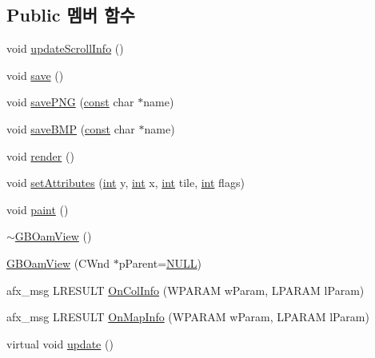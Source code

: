 \subsection*{Public 멤버 함수}
\begin{DoxyCompactItemize}
\item 
void \mbox{\hyperlink{class_g_b_oam_view_a20ce1c6ed837362872920c23e281e523}{update\+Scroll\+Info}} ()
\item 
void \mbox{\hyperlink{class_g_b_oam_view_a04f7a345e1f9d71b149b9df3b2db30d4}{save}} ()
\item 
void \mbox{\hyperlink{class_g_b_oam_view_a06b80040df2b94b034d5b0822ebc27ed}{save\+P\+NG}} (\mbox{\hyperlink{getopt1_8c_a2c212835823e3c54a8ab6d95c652660e}{const}} char $\ast$name)
\item 
void \mbox{\hyperlink{class_g_b_oam_view_a03a02a1b15d607e9891e58695dcfd7dc}{save\+B\+MP}} (\mbox{\hyperlink{getopt1_8c_a2c212835823e3c54a8ab6d95c652660e}{const}} char $\ast$name)
\item 
void \mbox{\hyperlink{class_g_b_oam_view_a6862114f9b3873d08f7ae8bd465c2eda}{render}} ()
\item 
void \mbox{\hyperlink{class_g_b_oam_view_a16e71e6ba20139f7ede42b3c884597d7}{set\+Attributes}} (\mbox{\hyperlink{_util_8cpp_a0ef32aa8672df19503a49fab2d0c8071}{int}} y, \mbox{\hyperlink{_util_8cpp_a0ef32aa8672df19503a49fab2d0c8071}{int}} x, \mbox{\hyperlink{_util_8cpp_a0ef32aa8672df19503a49fab2d0c8071}{int}} tile, \mbox{\hyperlink{_util_8cpp_a0ef32aa8672df19503a49fab2d0c8071}{int}} flags)
\item 
void \mbox{\hyperlink{class_g_b_oam_view_a8ed062f5cac9239a17b0f5942a5d9e5b}{paint}} ()
\item 
\mbox{\hyperlink{class_g_b_oam_view_afb55eb0347b0ba6460217f261489596a}{$\sim$\+G\+B\+Oam\+View}} ()
\item 
\mbox{\hyperlink{class_g_b_oam_view_a3e2e1ed3de07569a08af410042e1ba8f}{G\+B\+Oam\+View}} (C\+Wnd $\ast$p\+Parent=\mbox{\hyperlink{_system_8h_a070d2ce7b6bb7e5c05602aa8c308d0c4}{N\+U\+LL}})
\item 
afx\+\_\+msg L\+R\+E\+S\+U\+LT \mbox{\hyperlink{class_g_b_oam_view_a3b0623e23cfd8b04d576baed34f4d12d}{On\+Col\+Info}} (W\+P\+A\+R\+AM w\+Param, L\+P\+A\+R\+AM l\+Param)
\item 
afx\+\_\+msg L\+R\+E\+S\+U\+LT \mbox{\hyperlink{class_g_b_oam_view_af5f1f2fd340a83cbf218ef8be53f4089}{On\+Map\+Info}} (W\+P\+A\+R\+AM w\+Param, L\+P\+A\+R\+AM l\+Param)
\item 
virtual void \mbox{\hyperlink{class_g_b_oam_view_a4e4dc00c48996d9fb2dc1169b65b4cc8}{update}} ()
\end{DoxyCompactItemize}
